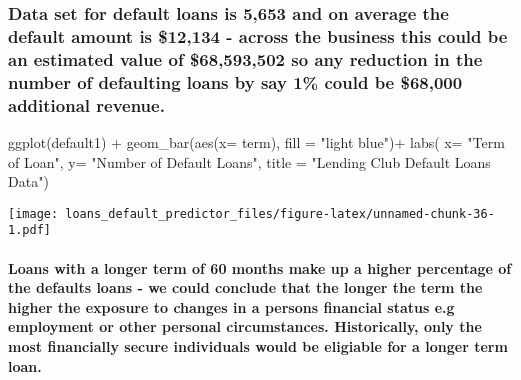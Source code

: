 \documentclass[
]{article}
\newenvironment{Shaded}{\begin{snugshade}}{\end{snugshade}}
\newcommand{\AttributeTok}[1]{\textcolor[rgb]{0.77,0.63,0.00}{#1}}
\newcommand{\FunctionTok}[1]{\textcolor[rgb]{0.00,0.00,0.00}{#1}}
\newcommand{\NormalTok}[1]{#1}
\newcommand{\SpecialCharTok}[1]{\textcolor[rgb]{0.00,0.00,0.00}{#1}}
\newcommand{\StringTok}[1]{\textcolor[rgb]{0.31,0.60,0.02}{#1}}
\begin{document}
\hypertarget{data-set-for-default-loans-is-5653-and-on-average-the-default-amount-is-12134---across-the-business-this-could-be-an-estimated-value-of-68593502-so-any-reduction-in-the-number-of-defaulting-loans-by-say-1-could-be-68000-additional-revenue.}{%
\subsubsection{Data set for default loans is 5,653 and on average the
default amount is \$12,134 - across the business this could be an
estimated value of \$68,593,502 so any reduction in the number of
defaulting loans by say 1\% could be \$68,000 additional
revenue.}\label{data-set-for-default-loans-is-5653-and-on-average-the-default-amount-is-12134---across-the-business-this-could-be-an-estimated-value-of-68593502-so-any-reduction-in-the-number-of-defaulting-loans-by-say-1-could-be-68000-additional-revenue.}}

\begin{Shaded}
\begin{Highlighting}[]
\FunctionTok{ggplot}\NormalTok{(default1) }\SpecialCharTok{+}
  \FunctionTok{geom\_bar}\NormalTok{(}\FunctionTok{aes}\NormalTok{(}\AttributeTok{x=}\NormalTok{ term), }\AttributeTok{fill =} \StringTok{"light blue"}\NormalTok{)}\SpecialCharTok{+}
\FunctionTok{labs}\NormalTok{( }\AttributeTok{x=} \StringTok{"Term of Loan"}\NormalTok{,}
        \AttributeTok{y=} \StringTok{"Number of Default Loans"}\NormalTok{,}
        \AttributeTok{title =} \StringTok{"Lending Club Default Loans Data"}\NormalTok{)}
\end{Highlighting}
\end{Shaded}

\texttt{[image: loans\_default\_predictor\_files/figure-latex/unnamed-chunk-36-1.pdf]}

\hypertarget{loans-with-a-longer-term-of-60-months-make-up-a-higher-percentage-of-the-defaults-loans---we-could-conclude-that-the-longer-the-term-the-higher-the-exposure-to-changes-in-a-persons-financial-status-e.g-employment-or-other-personal-circumstances.-historically-only-the-most-financially-secure-individuals-would-be-eligiable-for-a-longer-term-loan.}{%
\paragraph{Loans with a longer term of 60 months make up a higher
percentage of the defaults loans - we could conclude that the longer the
term the higher the exposure to changes in a persons financial status
e.g employment or other personal circumstances. Historically, only the
most financially secure individuals would be eligiable for a longer term
loan.}\label{loans-with-a-longer-term-of-60-months-make-up-a-higher-percentage-of-the-defaults-loans---we-could-conclude-that-the-longer-the-term-the-higher-the-exposure-to-changes-in-a-persons-financial-status-e.g-employment-or-other-personal-circumstances.-historically-only-the-most-financially-secure-individuals-would-be-eligiable-for-a-longer-term-loan.}}
\end{document}
